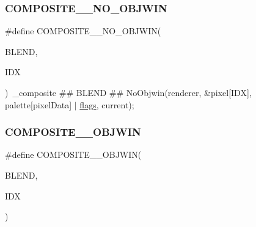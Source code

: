 \subsubsection{\texorpdfstring{C\+O\+M\+P\+O\+S\+I\+T\+E\+\_\+\_\+\+N\+O\+\_\+\+O\+B\+J\+W\+IN}{COMPOSITE\_16\_NO\_OBJWIN}}
{\footnotesize\ttfamily \#define C\+O\+M\+P\+O\+S\+I\+T\+E\+\_\+\_\+\+N\+O\+\_\+\+O\+B\+J\+W\+IN(\begin{DoxyParamCaption}\item[{}]{B\+L\+E\+ND,  }\item[{}]{I\+DX }\end{DoxyParamCaption})~\+\_\+composite \#\# B\+L\+E\+ND \#\# No\+Objwin(renderer, \&pixel\mbox{[}I\+DX\mbox{]}, palette\mbox{[}pixel\+Data\mbox{]} $\vert$ \mbox{\hyperlink{lr35902_2decoder_8c_a11f29eea941556f0630cfd3285f565c0}{flags}}, current);}

\mbox{\label{software-private_8h_ac5d796f7d762355873cc3ec872ca88d5}} 
\subsubsection{\texorpdfstring{C\+O\+M\+P\+O\+S\+I\+T\+E\+\_\+\_\+\+O\+B\+J\+W\+IN}{COMPOSITE\_16\_OBJWIN}}
{\footnotesize\ttfamily \#define C\+O\+M\+P\+O\+S\+I\+T\+E\+\_\+\_\+\+O\+B\+J\+W\+IN(\begin{DoxyParamCaption}\item[{}]{B\+L\+E\+ND,  }\item[{}]{I\+DX }\end{DoxyParamCaption})}

